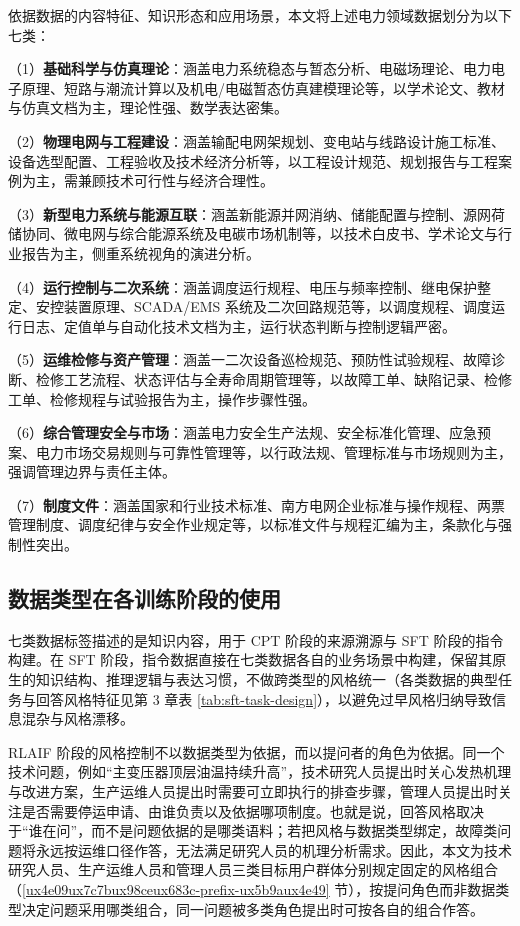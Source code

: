 \documentclass[fontset=fandol,type=master,campus=shenzhen,etitleauto=true]{hithesisbook}
\begin{document}
依据数据的内容特征、知识形态和应用场景，本文将上述电力领域数据划分为以下七类：

\noindent （1）\textbf{基础科学与仿真理论}：涵盖电力系统稳态与暂态分析、电磁场理论、电力电子原理、短路与潮流计算以及机电/电磁暂态仿真建模理论等，以学术论文、教材与仿真文档为主，理论性强、数学表达密集。

\noindent （2）\textbf{物理电网与工程建设}：涵盖输配电网架规划、变电站与线路设计施工标准、设备选型配置、工程验收及技术经济分析等，以工程设计规范、规划报告与工程案例为主，需兼顾技术可行性与经济合理性。

\noindent （3）\textbf{新型电力系统与能源互联}：涵盖新能源并网消纳、储能配置与控制、源网荷储协同、微电网与综合能源系统及电碳市场机制等，以技术白皮书、学术论文与行业报告为主，侧重系统视角的演进分析。

\noindent （4）\textbf{运行控制与二次系统}：涵盖调度运行规程、电压与频率控制、继电保护整定、安控装置原理、SCADA/EMS 系统及二次回路规范等，以调度规程、调度运行日志、定值单与自动化技术文档为主，运行状态判断与控制逻辑严密。

\noindent （5）\textbf{运维检修与资产管理}：涵盖一二次设备巡检规范、预防性试验规程、故障诊断、检修工艺流程、状态评估与全寿命周期管理等，以故障工单、缺陷记录、检修工单、检修规程与试验报告为主，操作步骤性强。

\noindent （6）\textbf{综合管理安全与市场}：涵盖电力安全生产法规、安全标准化管理、应急预案、电力市场交易规则与可靠性管理等，以行政法规、管理标准与市场规则为主，强调管理边界与责任主体。

\noindent （7）\textbf{制度文件}：涵盖国家和行业技术标准、南方电网企业标准与操作规程、两票管理制度、调度纪律与安全作业规定等，以标准文件与规程汇编为主，条款化与强制性突出。

\subsection{数据类型在各训练阶段的使用}\label{subsec:data-mapping}

七类数据标签描述的是知识内容，用于 CPT 阶段的来源溯源与 SFT 阶段的指令构建。在 SFT 阶段，指令数据直接在七类数据各自的业务场景中构建，保留其原生的知识结构、推理逻辑与表达习惯，不做跨类型的风格统一（各类数据的典型任务与回答风格特征见第 3 章表 \ref{tab:sft-task-design}），以避免过早风格归纳导致信息混杂与风格漂移。

RLAIF 阶段的风格控制不以数据类型为依据，而以提问者的角色为依据。同一个技术问题，例如“主变压器顶层油温持续升高”，技术研究人员提出时关心发热机理与改进方案，生产运维人员提出时需要可立即执行的排查步骤，管理人员提出时关注是否需要停运申请、由谁负责以及依据哪项制度。也就是说，回答风格取决于“谁在问”，而不是问题依据的是哪类语料；若把风格与数据类型绑定，故障类问题将永远按运维口径作答，无法满足研究人员的机理分析需求。因此，本文为技术研究人员、生产运维人员和管理人员三类目标用户群体分别规定固定的风格组合（\ref{ux4e09ux7c7bux98ceux683c-prefix-ux5b9aux4e49} 节），按提问角色而非数据类型决定问题采用哪类组合，同一问题被多类角色提出时可按各自的组合作答。
\end{document}
